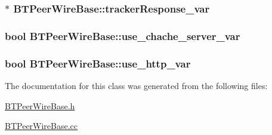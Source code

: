 \subsubsection[{tracker\+Response\+\_\+var}]{$\ast$ B\+T\+Peer\+Wire\+Base\+::tracker\+Response\+\_\+var\hspace{0.3cm}{\ttfamily [protected]}}\label{classBTPeerWireBase_a4dd433fcd65380323cb62e4b74b73b96}
\hypertarget{classBTPeerWireBase_a5dffbc63fa4a4c544a77cbfb4a46908c}{}
\subsubsection[{use\+\_\+chache\+\_\+server\+\_\+var}]{\setlength{\rightskip}{0pt plus 5cm}bool B\+T\+Peer\+Wire\+Base\+::use\+\_\+chache\+\_\+server\+\_\+var\hspace{0.3cm}{\ttfamily [protected]}}\label{classBTPeerWireBase_a5dffbc63fa4a4c544a77cbfb4a46908c}
\hypertarget{classBTPeerWireBase_ad26a2be1531a341894c3bb2b35ee465e}{}
\subsubsection[{use\+\_\+http\+\_\+var}]{\setlength{\rightskip}{0pt plus 5cm}bool B\+T\+Peer\+Wire\+Base\+::use\+\_\+http\+\_\+var\hspace{0.3cm}{\ttfamily [protected]}}\label{classBTPeerWireBase_ad26a2be1531a341894c3bb2b35ee465e}


The documentation for this class was generated from the following files\+:\begin{DoxyCompactItemize}
\item 
\hyperlink{BTPeerWireBase_8h}{B\+T\+Peer\+Wire\+Base.\+h}\item 
\hyperlink{BTPeerWireBase_8cc}{B\+T\+Peer\+Wire\+Base.\+cc}\end{DoxyCompactItemize}
